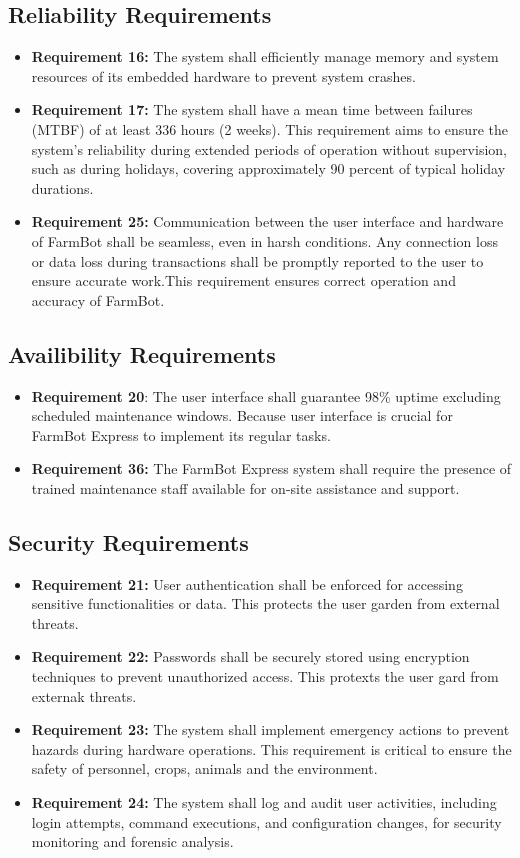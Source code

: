 \subsection{Reliability Requirements}
\begin{itemize}
	\item \textbf {Requirement 16:} The system shall efficiently manage memory and system resources of its embedded hardware to prevent system crashes.
	\item \textbf{Requirement 17:} The system shall have a mean time between failures (MTBF) of at least 336 hours (2 weeks). This requirement aims to ensure the system's reliability during extended periods of operation without supervision, such as during holidays, covering approximately 90 percent of typical holiday durations.
	\item \textbf{Requirement 25:} Communication between the user interface and hardware of FarmBot shall be seamless, even in harsh conditions. Any connection loss or data loss during transactions shall be promptly reported to the user to ensure accurate work.This requirement ensures correct operation and accuracy of FarmBot.
\end{itemize}

\subsection{Availibility Requirements}
\begin{itemize}
	\item \textbf{Requirement 20}: The user interface shall guarantee 98\% uptime excluding scheduled maintenance windows. Because user interface is crucial for FarmBot Express to implement its regular tasks.
	\item \textbf{Requirement 36:} The FarmBot Express system shall require the presence of trained maintenance staff available for on-site assistance and support.
\end{itemize}

\subsection{Security Requirements}
\begin{itemize}
	\item \textbf{Requirement 21:} User authentication shall be enforced for accessing sensitive functionalities or data. This protects the user garden from external threats.
	\item \textbf{Requirement 22:} Passwords shall be securely stored using encryption techniques to prevent unauthorized access. This protexts the user gard from externak threats.
	\item \textbf{Requirement 23:} The system shall implement emergency actions to prevent hazards during hardware operations. This requirement is critical to ensure the safety of personnel, crops, animals and the environment.
	\item \textbf{Requirement 24:} The system shall log and audit user activities, including login attempts, command executions, and configuration changes, for security monitoring and forensic analysis.
\end{itemize}

